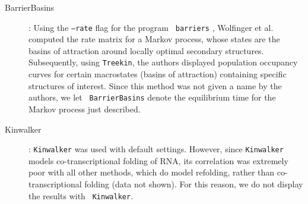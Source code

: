 \begin{description}
\item[BarrierBasins]: Using the {\tt --rate} flag for the program {\tt
barriers} \cite{flammHofacker}, Wolfinger et al.
\cite{wolfingerStadler:kinetics} computed the rate matrix for a Markov
process, whose states are the basins of attraction around locally
optimal secondary structures. Subsequently, using {\tt Treekin}, the
authors displayed population occupancy curves for certain macrostates
(basins of attraction) containing specific structures of interest.
Since this method was not given a name by the authors, we let {\tt
BarrierBasins} denote the equilibrium time for the Markov process just
described.

\item[Kinwalker]: {\tt Kinwalker} was used with default settings.
However, since {\tt Kinwalker} models co-transcriptional folding of
RNA, its correlation was extremely poor with all other methods, which
do model refolding, rather than co-transcriptional folding (data not
shown). For this reason, we do not display the results with {\tt
Kinwalker}.
\end{description}
